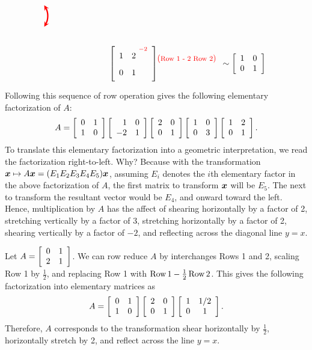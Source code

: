 \begin{Exam}
\[\begin{tikzpicture}
\path (0,-2) node {$\mtx{rr}{
1&2{\Big.^{\color{red}\ -2}}\\
0&1\phantom{\Big.^{\color{red}\ -2}}}
\hspace{-7 pt}\begin{array}{c} \color{red} \footnotesize  (\text{Row 1 - 2 Row 2}) \\ \mbox{} \end{array} \sim \mtx{rr}{1&0\\0&1} $};
\begin{scope}[tips=proper]
\draw[ultra thick, red, stealth-stealth] (-6,-0.45) edge[bend right] (-6,0.45);
\end{scope}
\end{tikzpicture} \]
Following this sequence of row operation gives the following elementary factorization of $A$:
\[A = \mtx{rr}{0&1\\1&0}\mtx{rr}{1&0\\-2&1}\mtx{rr}{2&0\\0&1}\mtx{rr}{1&0\\0&3}\mtx{rr}{1&2\\0&1}.\] To translate this elementary factorization into a geometric interpretation, we read the factorization right-to-left. Why? Because with the transformation $\bb x \mapsto A\bb x = (E_1E_2E_3E_4E_5)\bb x$, assuming $E_i$ denotes the $i$th elementary factor in the above factorization of $A$, the first matrix to transform $\bb x$ will be $E_5$. The next to transform the resultant vector would be $E_4$, and onward toward the left. Hence, multiplication by $A$ has the affect of shearing horizontally by a factor of 2, stretching vertically by a factor of 3, stretching horizontally by a factor of 2, shearing vertically by a factor of $-2$, and reflecting across the diagonal line $y=x$. 
\end{Exam}

\begin{Exam} Let $A = \mtx{rr}{0&1\\2&1}$. We can row reduce $A$ by interchanges Rows 1 and 2, scaling Row 1 by $\frac{1}{2}$, and replacing Row 1 with $\row 1 - \frac{1}{2}\row 2$. This gives the following factorization into elementary matrices as
\[A = \mtx{rr}{0&1\\1&0}\mtx{rr}{2&0\\0&1}\mtx{cc}{1&1/2\\0&1}.\] Therefore, $A$ corresponds to the transformation shear horizontally by $\frac{1}{2}$, horizontally stretch by 2, and reflect across the line $y=x$.
\end{Exam}

